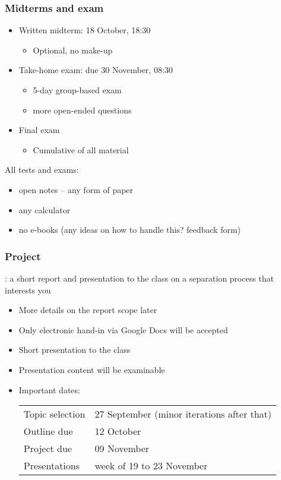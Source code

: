 \begin{frame}\frametitle{Midterms and exam}
	\begin{itemize}
		\item	Written midterm: 18 October, 18:30
		\begin{itemize}
			\item	Optional, no make-up
		\end{itemize}
		
		\item	Take-home exam: due 30 November, 08:30
		\begin{itemize}
			\item	5-day group-based exam
			\item	more open-ended questions
		\end{itemize}
		
		\item	Final exam
		\begin{itemize}
			\item	Cumulative of all material
		\end{itemize}		
	\end{itemize}

	\vspace{12pt}
	All tests and exams:
	\begin{itemize}
		\item	open notes -- any form of paper
		\item	any calculator
		\item	no e-books (any ideas on how to handle this? feedback form)
	\end{itemize}	
\end{frame}

\begin{frame}\frametitle{Project}
	\begin{exampleblock}{}
		\textbf{{\color{myBlue}{AIM}}}: a short report and presentation to the class on a separation process that interests you
	\end{exampleblock}
	\begin{itemize}
		\item	More details on the report scope later
		\item	Only electronic hand-in via Google Docs will be accepted
		\item	Short presentation to the class
		\item	Presentation content will be examinable
		\item	Important dates: 
		
		\vspace{12pt}
		\begin{tabular}{ll}
			Topic selection & 27 September (minor iterations after that)\\
			Outline due & 12 October\\
			Project due & 09 November\\
			Presentations & week of 19 to 23 November\\
		\end{tabular}
	\end{itemize}
\end{frame}

